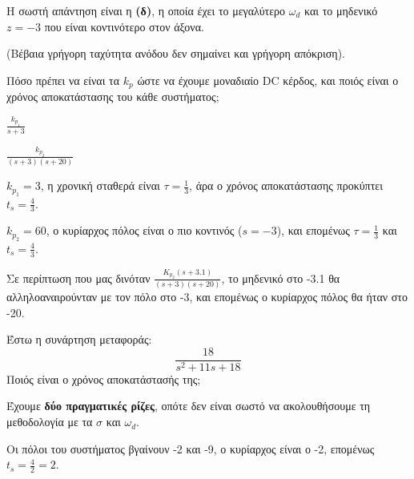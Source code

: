 \documentclass[11pt,a4paper,notitlepage,fleqn]{article}
\begin{document}
\begin{exercise}

Η σωστή απάντηση είναι η \textbf{(δ)}, η οποία έχει το μεγαλύτερο \( \omega_d \) και το
μηδενικό \( z=-3 \) που είναι κοντινότερο στον άξονα.

(Βέβαια γρήγορη ταχύτητα ανόδου δεν σημαίνει και γρήγορη απόκριση).

\end{exercise}
\begin{exercise}
Πόσο πρέπει να είναι τα \( k_p \) ώστε να έχουμε μοναδιαίο DC κέρδος, και ποιός είναι ο
χρόνος αποκατάστασης του κάθε συστήματος;

\begin{enumlatin}
	\item \( \displaystyle \frac{k_{p_1}}{s+3} \)
	\item \( \displaystyle \frac{k_{p_2}}{(s+3)(s+20)} \)
\end{enumlatin}

\tcblower
\begin{enumlatin}
	\item \( k_{p_1} = 3 \), η χρονική σταθερά είναι \( τ=\frac{1}{3} \), άρα
	ο χρόνος αποκατάστασης προκύπτει
	\( t_s = \frac{4}{3} \).
	\item \( k_{p_2} = 60 \), ο κυρίαρχος πόλος είναι ο πιο κοντινός (\( s=-3 \)), και
	επομένως \( τ=\frac{1}{3} \) και \( t_s = \frac{4}{3} \).
\end{enumlatin}

Σε περίπτωση που μας δινόταν \( \displaystyle \frac{K_{p_2}(s+3.1)}{(s+3)(s+20)} \), το
μηδενικό στο -3.1 θα αλληλοαναιρούνταν με τον πόλο στο -3, και επομένως ο κυρίαρχος πόλος θα
ήταν στο -20.

\end{exercise}
\begin{exercise}
Έστω η συνάρτηση μεταφοράς:
\[
\frac{18}{s^2+11s+18}
\]
Ποιός είναι ο χρόνος αποκατάστασής της;

\tcblower

\begin{attnbox}{}
	Έχουμε \textbf{δύο πραγματικές ρίζες}, οπότε δεν είναι σωστό να ακολουθήσουμε τη
	μεθοδολογία με τα \( σ \) και \( \omega_d \).
\end{attnbox}

Οι πόλοι του συστήματος βγαίνουν -2 και -9, ο κυρίαρχος είναι ο -2, επομένως \( t_s=\frac{4}{2} = 2 \).

\end{exercise}
\end{document}
